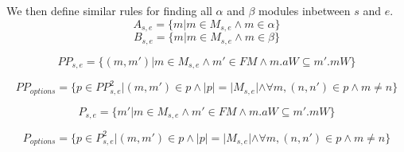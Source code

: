 We then define similar rules for finding all $\alpha$ and $\beta$ modules inbetween $s$ and $e$.
\[A_{s,e} = \{m |m \in M_{s,e} \land m \in \alpha\}\]
\[B_{s,e} = \{m |m \in M_{s,e} \land m \in \beta\}\]


\[PP_{s, e} = \{(m, m')| m \in M_{s,e} \land m' \in FM \land m.aW \subseteq m'.mW\} \]

\[ PP_{options} = \{p \in {PP}_{s,e}^2 | (m,m') \in p \land |p| = |M_{s,e}| \land  \forall m , (n,n') \in p \land m \neq n \} \]


\[P_{s, e} = \{m'| m \in M_{s,e} \land m' \in FM \land m.aW \subseteq m'.mW\} \]

\[ P_{options} = \{p \in {P}_{s,e}^2 | (m,m') \in p \land |p| = |M_{s,e}| \land  \forall m , (n,n') \in p \land m \neq n \} \]



